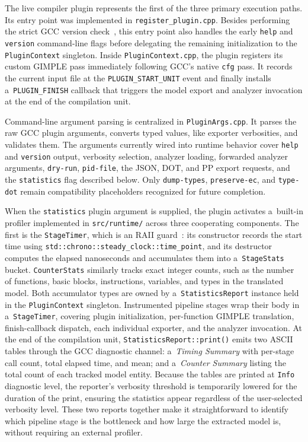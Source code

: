 \documentclass[xpsejal00-gcc-plugin.tex]{subfiles}
\begin{document}
The live compiler plugin represents the first of the three primary execution paths.
Its entry point was implemented in \texttt{register\_plugin.cpp}.
Besides performing the strict GCC version check~\cite{GCCInternals}, this entry point also handles the early \texttt{help} and \texttt{version} command-line flags before delegating the remaining initialization to the \texttt{PluginContext} singleton.
Inside \texttt{PluginContext.cpp}, the plugin registers its custom GIMPLE pass immediately following GCC's native \texttt{cfg} pass.
It records the current input file at the \texttt{PLUGIN\_START\_UNIT} event and finally installs a~\texttt{PLUGIN\_FINISH} callback that triggers the model export and analyzer invocation at the end of the compilation unit.

Command-line argument parsing is centralized in \texttt{PluginArgs.cpp}.
It parses the raw GCC plugin arguments, converts typed values, like exporter verbosities, and validates them.
The arguments currently wired into runtime behavior cover \texttt{help} and \texttt{version} output, verbosity selection, analyzer loading, forwarded analyzer arguments, \texttt{dry-run}, \texttt{pid-file}, the JSON, DOT, and PP export requests, and the \texttt{statistics} flag described below.
Only \texttt{dump-types}, \texttt{preserve-ec}, and \texttt{type-dot} remain compatibility placeholders recognized for future completion.

When the \texttt{statistics} plugin argument is supplied, the plugin activates a~built-in profiler implemented in \texttt{src/runtime/} across three cooperating components.
The first is the \texttt{StageTimer}, which is an RAII guard~\cite{Cpp}: its constructor records the start time using \texttt{std::chrono::steady\_clock::time\_point}, and its destructor computes the elapsed nanoseconds and accumulates them into a~\texttt{StageStats} bucket.
\texttt{CounterStats} similarly tracks exact integer counts, such as the number of functions, basic blocks, instructions, variables, and types in the translated model.
Both accumulator types are owned by a~\texttt{StatisticsReport} instance held in the \texttt{PluginContext} singleton.
Instrumented pipeline stages wrap their body in a~\texttt{StageTimer}, covering plugin initialization, per-function GIMPLE translation, finish-callback dispatch, each individual exporter, and the analyzer invocation.
At the end of the compilation unit, \texttt{StatisticsReport::print()} emits two ASCII tables through the GCC diagnostic channel: a~\textit{Timing Summary} with per-stage call count, total elapsed time, and mean; and a~\textit{Counter Summary} listing the total count of each tracked model entity.
Because the tables are printed at \texttt{Info} diagnostic level, the reporter's verbosity threshold is temporarily lowered for the duration of the print, ensuring the statistics appear regardless of the user-selected verbosity level.
These two reports together make it straightforward to identify which pipeline stage is the bottleneck and how large the extracted model is, without requiring an external profiler.
\end{document}
